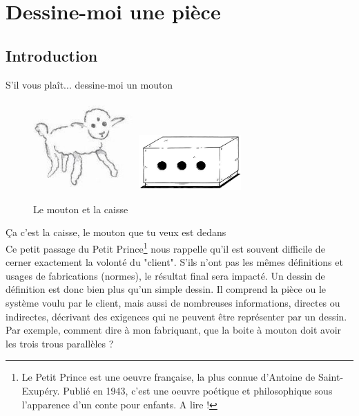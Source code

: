 \documentclass[
	11pt, %
	fleqn, %
	a4paper, %
]{LegrandOrangeBook}
\begin{document}

\chapter{Dessine-moi une pièce}
\section{Introduction}\label{dessin}


 \og S'il vous plaît... dessine-moi un mouton \fg


\begin{figure}[H] %
	\centering %
	\includegraphics[width=0.35\textwidth]{Images/Mou2.JPG} %
    \includegraphics[width=0.35\textwidth]{Images/Mou1.JPG} %
	\caption{Le mouton et la caisse}
	\label{Mou} %
\end{figure}



    \og Ça c'est la caisse, le mouton que tu veux est dedans\fg \\



Ce petit passage du Petit Prince\footnote{Le Petit Prince est une oeuvre française, la plus connue d'Antoine de Saint-Exupéry. Publié en 1943, c'est une oeuvre poétique et philosophique sous l'apparence d'un conte pour enfants. A lire !} nous rappelle qu'il est souvent difficile de cerner exactement la volonté du "client". S'ils n'ont pas les mêmes définitions et usages de fabrications (normes), le résultat final sera impacté. Un dessin de définition est donc bien plus qu'un simple dessin. Il comprend la pièce ou le système voulu par le client, mais aussi de nombreuses informations, directes ou indirectes, décrivant des exigences qui ne peuvent être représenter par un dessin. Par exemple, comment dire à mon fabriquant, que la boite à mouton doit avoir les trois trous parallèles ?\\
\end{document}
